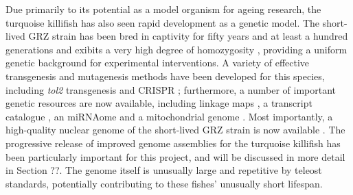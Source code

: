 Due primarily to its potential as a model organism for ageing research, the turquoise killifish has also seen rapid development as a genetic model. The short-lived GRZ strain has been bred in captivity for fifty years and at least a hundred generations \citep{terzibasi2007review} and exibits a very high degree of homozygosity \citep{reichwald2009genome,valenzano2009map,kirschner2012map}, providing a uniform genetic background for experimental interventions. A variety of effective transgenesis and mutagenesis methods have been developed for this species, including \textit{tol2} transgenesis \citep{valenzano2011tol2,hartmann2012tol2,allard2013inducible} %
and CRISPR \citep{harel2015crispr,harel2016crispr}; furthermore, a number of important genetic resources are now available, including linkage maps \citep{valenzano2009map,kirschner2012map,valenzano2015genome}, a transcript catalogue \citep{petzold2013transcriptome}, an miRNAome %
and a mitochondrial genome \citep{hartmann2011mitochondria}. Most importantly, a high-quality nuclear genome of the short-lived GRZ strain is now available
\citep{reichwald2015genome,valenzano2015genome}. %
The progressive release of improved genome assemblies for the turquoise killifish has been particularly important for this project, and will be discussed in more detail in Section ??. %
The genome itself is unusually large and repetitive by teleost standards, potentially contributing to these fishes' unusually short lifespan. %





